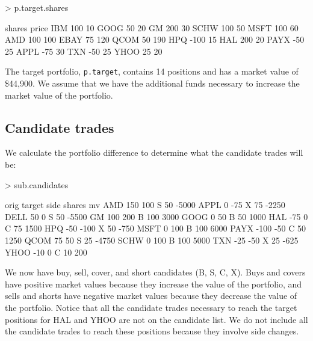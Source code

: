 \documentclass{article}
\begin{document}
\begin{Schunk}
\begin{Sinput}
> p.target.shares
\end{Sinput}
\begin{Soutput}
     shares price
IBM     100    10
GOOG     50    20
GM      200    30
SCHW    100    50
MSFT    100    60
AMD     100   100
EBAY     75   120
QCOM     50   190
HPQ    -100    15
HAL     200    20
PAYX    -50    25
APPL    -75    30
TXN     -50    25
YHOO     25    20
\end{Soutput}
\end{Schunk}

The target portfolio, \texttt{p.target}, contains
14 positions and has a market value of
\$44,900.  We assume that we have the
additional funds necessary to increase the market value of the
portfolio.

\subsection{Candidate trades}

We calculate the portfolio difference to determine what the candidate
trades will be:


\begin{Schunk}
\begin{Sinput}
> sub.candidates
\end{Sinput}
\begin{Soutput}
     orig target side shares    mv
AMD   150    100    S     50 -5000
APPL    0    -75    X     75 -2250
DELL   50      0    S     50 -5500
GM    100    200    B    100  3000
GOOG    0     50    B     50  1000
HAL   -75      0    C     75  1500
HPQ   -50   -100    X     50  -750
MSFT    0    100    B    100  6000
PAYX -100    -50    C     50  1250
QCOM   75     50    S     25 -4750
SCHW    0    100    B    100  5000
TXN   -25    -50    X     25  -625
YHOO  -10      0    C     10   200
\end{Soutput}
\end{Schunk}

We now have buy, sell, cover, and short candidates (B, S, C, X).
Buys and covers have positive market values because they increase the
value of the portfolio, and sells and shorts have negative market
values because they decrease the value of the portfolio.  Notice that
all the candidate trades necessary to reach the target positions for
HAL and YHOO are not on the candidate list.  We do not include all the
candidate trades to reach these positions because they involve side
changes.
\end{document}

